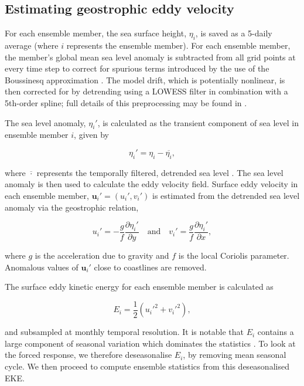 \documentclass[linenumbers]{agujournal2019}
\begin{document}
\subsection{Estimating geostrophic eddy velocity}
For each ensemble member, the sea surface height, $\eta_i$, is saved as a 5-daily average (where $i$ represents the ensemble member). 
For each ensemble member, the member's global mean sea level anomaly is subtracted from all grid points at every time step to correct for spurious terms introduced by the use of the Boussinesq approximation \citep{Greatbatch1994}. 
The model drift, which is potentially nonlinear, is then corrected for by detrending using a LOWESS filter \citep{Cleveland1979} in combination with a 5th-order spline; full details of this preprocessing may be found in \cite{Close2020}.

The sea level anomaly, $\eta_i'$, is calculated as the transient component of sea level in ensemble member $i$, given by 
\begin{linenomath*}
\begin{equation}
\eta_i' = \eta_i - \overline{\eta_i},
\end{equation}
\end{linenomath*}
where $\overline{\cdot}$ represents the temporally filtered, detrended sea level \citep{Close2020}.
The sea level anomaly is then used to calculate the eddy velocity field.
Surface eddy velocity in each ensemble member, $\mathbf{u}_i' = (u_i', v_i')$ is estimated from the detrended sea level anomaly via the geostrophic relation,
\begin{linenomath*}
\begin{equation}
u_i' = - \frac{g}{f} \frac{\partial \eta_i'}{\partial y} \quad \text{and} \quad v_i' = \frac{g}{f} \frac{\partial \eta_i'}{\partial x},
\end{equation}
\end{linenomath*}
where $g$ is the acceleration due to gravity and $f$ is the local Coriolis parameter.
Anomalous values of $\mathbf{u}_i'$ close to coastlines are removed.

The surface eddy kinetic energy for each ensemble member is calculated as 
\begin{linenomath*}
\begin{equation}
E_i = \frac{1}{2}(u_i'^2 + v_i'^2),
\end{equation}
\end{linenomath*}
and subsampled at monthly temporal resolution.
It is notable that $E_i$ contains a large component of seasonal variation which dominates the statistics \citep{Martinez-Moreno2021}.
To look at the forced response, we therefore deseasonalise $E_i$, by removing mean seasonal cycle.
We then proceed to compute ensemble statistics from this deseasonalised EKE.
\end{document}
